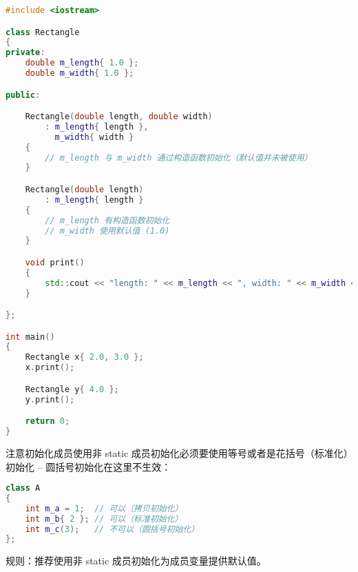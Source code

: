 \documentclass[../../LearnCpp.tex]{subfiles}
\begin{document}
\begin{lstlisting}[language=C++]
#include <iostream>

class Rectangle
{
private:
    double m_length{ 1.0 };
    double m_width{ 1.0 };

public:

    Rectangle(double length, double width)
        : m_length{ length },
          m_width{ width }
    {
        // m_length 与 m_width 通过构造函数初始化（默认值并未被使用）
    }

    Rectangle(double length)
        : m_length{ length }
    {
        // m_length 有构造函数初始化
        // m_width 使用默认值 (1.0)
    }

    void print()
    {
        std::cout << "length: " << m_length << ", width: " << m_width << '\n';
    }

};

int main()
{
    Rectangle x{ 2.0, 3.0 };
    x.print();

    Rectangle y{ 4.0 };
    y.print();

    return 0;
}
\end{lstlisting}

注意初始化成员使用非 static 成员初始化必须要使用等号或者是花括号（标准化）初始化 -- 圆括号初始化在这里不生效：

\begin{lstlisting}[language=C++]
class A
{
    int m_a = 1;  // 可以（拷贝初始化）
    int m_b{ 2 }; // 可以（标准初始化）
    int m_c(3);   // 不可以（圆括号初始化）
};
\end{lstlisting}

规则：推荐使用非 static 成员初始化为成员变量提供默认值。
\end{document}
